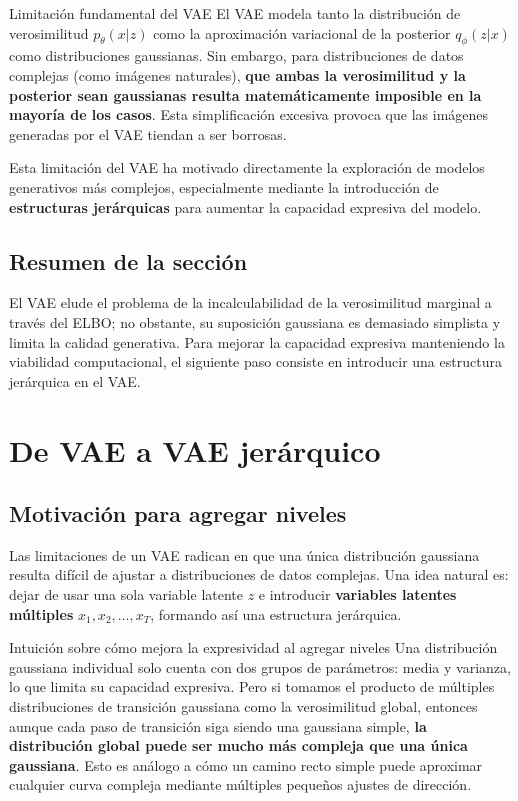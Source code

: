 \documentclass[a4paper]{article}
\begin{document}
\begin{warningbox}{Limitación fundamental del VAE}
El VAE modela tanto la distribución de verosimilitud $p_\theta(x|z)$ como la aproximación variacional de la posterior $q_\phi(z|x)$ como distribuciones gaussianas. Sin embargo, para distribuciones de datos complejas (como imágenes naturales), \textbf{que ambas la verosimilitud y la posterior sean gaussianas resulta matemáticamente imposible en la mayoría de los casos}. Esta simplificación excesiva provoca que las imágenes generadas por el VAE tiendan a ser borrosas.
\end{warningbox}

Esta limitación del VAE ha motivado directamente la exploración de modelos generativos más complejos, especialmente mediante la introducción de \textbf{estructuras jerárquicas} para aumentar la capacidad expresiva del modelo.

\subsection{Resumen de la sección}

El VAE elude el problema de la incalculabilidad de la verosimilitud marginal a través del ELBO; no obstante, su suposición gaussiana es demasiado simplista y limita la calidad generativa. Para mejorar la capacidad expresiva manteniendo la viabilidad computacional, el siguiente paso consiste en introducir una estructura jerárquica en el VAE.

\section{De VAE a VAE jerárquico}

\subsection{Motivación para agregar niveles}

Las limitaciones de un VAE radican en que una única distribución gaussiana resulta difícil de ajustar a distribuciones de datos complejas. Una idea natural es: dejar de usar una sola variable latente $z$ e introducir \textbf{variables latentes múltiples} $x_1, x_2, \ldots, x_T$, formando así una estructura jerárquica.

\begin{knowledgebox}{Intuición sobre cómo mejora la expresividad al agregar niveles}
Una distribución gaussiana individual solo cuenta con dos grupos de parámetros: media y varianza, lo que limita su capacidad expresiva. Pero si tomamos el producto de múltiples distribuciones de transición gaussiana como la verosimilitud global, entonces aunque cada paso de transición siga siendo una gaussiana simple, \textbf{la distribución global puede ser mucho más compleja que una única gaussiana}. Esto es análogo a cómo un camino recto simple puede aproximar cualquier curva compleja mediante múltiples pequeños ajustes de dirección.
\end{knowledgebox}
\end{document}
